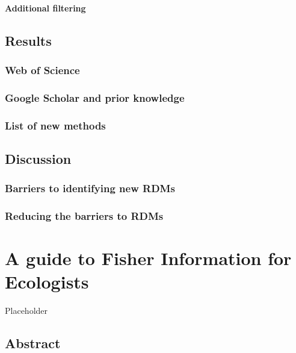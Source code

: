 \documentclass[12pt,twoside,openany]{reedthesis}
\begin{document}
\subsubsection{Additional filtering}\label{additional-filtering}

\section{Results}\label{results}

\subsection{Web of Science}\label{web-of-science-1}

\subsection{Google Scholar and prior
knowledge}\label{google-scholar-and-prior-knowledge}

\subsection{List of new methods}\label{list-of-new-methods}

\section{Discussion}\label{discussion}

\subsection{Barriers to identifying new
RDMs}\label{barriers-to-identifying-new-rdms}

\subsection{Reducing the barriers to
RDMs}\label{reducing-the-barriers-to-rdms}

\chapter{A guide to Fisher Information for Ecologists}\label{fiGuide}

Placeholder

\section{Abstract}\label{abstract}
\end{document}
